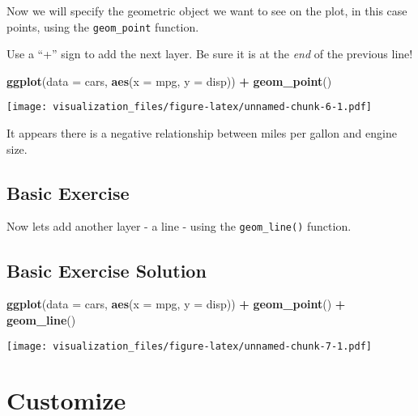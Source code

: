 \documentclass[oneside]{memoir}
\newenvironment{Shaded}{\begin{snugshade}}{\end{snugshade}}
\newcommand{\KeywordTok}[1]{\textcolor[rgb]{0.13,0.29,0.53}{\textbf{#1}}}
\newcommand{\DataTypeTok}[1]{\textcolor[rgb]{0.13,0.29,0.53}{#1}}
\newcommand{\StringTok}[1]{\textcolor[rgb]{0.31,0.60,0.02}{#1}}
\newcommand{\OperatorTok}[1]{\textcolor[rgb]{0.81,0.36,0.00}{\textbf{#1}}}
\newcommand{\NormalTok}[1]{#1}
\theoremstyle{definition}
\theoremstyle{definition}
\theoremstyle{definition}
\theoremstyle{remark}
\begin{document}
Now we will specify the geometric object we want to see on the plot, in
this case points, using the \texttt{geom\_point} function.

Use a ``+'' sign to add the next layer. Be sure it is at the \emph{end}
of the previous line!

\begin{Shaded}
\begin{Highlighting}[]
\KeywordTok{ggplot}\NormalTok{(}\DataTypeTok{data =}\NormalTok{ cars, }\KeywordTok{aes}\NormalTok{(}\DataTypeTok{x =}\NormalTok{ mpg, }\DataTypeTok{y =}\NormalTok{ disp)) }\OperatorTok{+}
\StringTok{  }\KeywordTok{geom_point}\NormalTok{()}
\end{Highlighting}
\end{Shaded}

\texttt{[image: visualization\_files/figure-latex/unnamed-chunk-6-1.pdf]}

It appears there is a negative relationship between miles per gallon and
engine size.

\section{Basic Exercise}\label{basic-exercise}

Now lets add another layer - a line - using the \texttt{geom\_line()}
function.

\section{Basic Exercise Solution}\label{basic-exercise-solution}

\begin{Shaded}
\begin{Highlighting}[]
\KeywordTok{ggplot}\NormalTok{(}\DataTypeTok{data =}\NormalTok{ cars, }\KeywordTok{aes}\NormalTok{(}\DataTypeTok{x =}\NormalTok{ mpg, }\DataTypeTok{y =}\NormalTok{ disp)) }\OperatorTok{+}
\StringTok{  }\KeywordTok{geom_point}\NormalTok{() }\OperatorTok{+}
\StringTok{  }\KeywordTok{geom_line}\NormalTok{()}
\end{Highlighting}
\end{Shaded}

\texttt{[image: visualization\_files/figure-latex/unnamed-chunk-7-1.pdf]}

\chapter{Customize}\label{customize}
\end{document}
